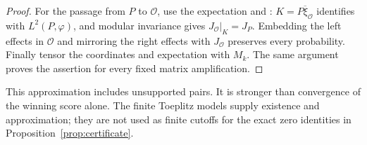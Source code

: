 \begin{proof}
For the passage from $P$ to $\mathcal O$, use the expectation and \cite[Lemma 3.1]{TypeGames}: $K=\overline{P\xi_{\mathcal O}}$ identifies with $L^2(P,\varphi)$, and modular invariance gives $J_{\mathcal O}|_K=J_P$. Embedding the left effects in $\mathcal O$ and mirroring the right effects with $J_{\mathcal O}$ preserves every probability. Finally tensor the coordinates and expectation with $M_k$. The same argument proves the assertion for every fixed matrix amplification.
\end{proof}
This approximation includes unsupported pairs. It is stronger than convergence of the winning score alone. The finite Toeplitz models supply existence and approximation; they are not used as finite cutoffs for the exact zero identities in Proposition~\ref{prop:certificate}.
